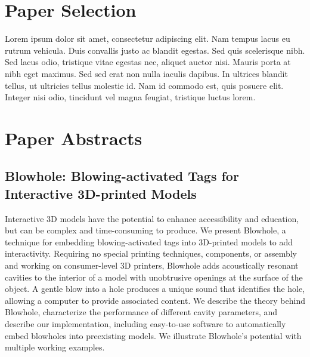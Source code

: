   \section*{Paper Selection}
    Lorem ipsum dolor sit amet, consectetur adipiscing elit. Nam tempus lacus eu
    rutrum vehicula. Duis convallis justo ac blandit egestas. Sed quis
    scelerisque nibh. Sed lacus odio, tristique vitae egestas nec, aliquet auctor
    nisi. Mauris porta at nibh eget maximus. Sed sed erat non nulla iaculis
    dapibus. In ultrices blandit tellus, ut ultricies tellus molestie id. Nam id
    commodo est, quis posuere elit. Integer nisi odio, tincidunt vel magna
    feugiat, tristique luctus lorem.

  \section*{Paper Abstracts}
    \subsection*{Blowhole: Blowing-activated Tags for Interactive 3D-printed
      Models}
      Interactive 3D models have the potential to enhance accessibility and
      education, but can be complex and time-consuming to produce. We present
      Blowhole, a technique for embedding blowing-activated tags into
      3D-printed models to add interactivity. Requiring no special printing
      techniques, components, or assembly and working on consumer-level 3D
      printers, Blowhole adds acoustically resonant cavities to the interior
      of a model with unobtrusive openings at the surface of the object. A
      gentle blow into a hole produces a unique sound that identifies the
      hole, allowing a computer to provide associated content. We describe
      the theory behind Blowhole, characterize the performance of different
      cavity parameters, and describe our implementation, including
      easy-to-use software to automatically embed blowholes into preexisting
      models. We illustrate Blowhole's potential with multiple working
      examples.

